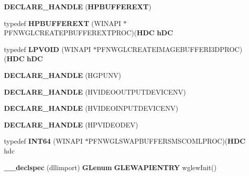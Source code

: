 \begin{DoxyCompactItemize}
\item 
{\bf D\+E\+C\+L\+A\+R\+E\+\_\+\+H\+A\+N\+D\+LE} ({\bf H\+P\+B\+U\+F\+F\+E\+R\+E\+XT})
\item 
typedef {\bf H\+P\+B\+U\+F\+F\+E\+R\+E\+XT} (W\+I\+N\+A\+PI $\ast$P\+F\+N\+W\+G\+L\+C\+R\+E\+A\+T\+E\+P\+B\+U\+F\+F\+E\+R\+E\+X\+T\+P\+R\+OC)({\bf H\+DC} {\bf h\+DC}
\item 
typedef {\bf L\+P\+V\+O\+ID} (W\+I\+N\+A\+PI $\ast$P\+F\+N\+W\+G\+L\+C\+R\+E\+A\+T\+E\+I\+M\+A\+G\+E\+B\+U\+F\+F\+E\+R\+I3\+D\+P\+R\+OC)({\bf H\+DC} {\bf h\+DC}
\item 
{\bf D\+E\+C\+L\+A\+R\+E\+\_\+\+H\+A\+N\+D\+LE} (H\+G\+P\+U\+NV)
\item 
{\bf D\+E\+C\+L\+A\+R\+E\+\_\+\+H\+A\+N\+D\+LE} (H\+V\+I\+D\+E\+O\+O\+U\+T\+P\+U\+T\+D\+E\+V\+I\+C\+E\+NV)
\item 
{\bf D\+E\+C\+L\+A\+R\+E\+\_\+\+H\+A\+N\+D\+LE} (H\+V\+I\+D\+E\+O\+I\+N\+P\+U\+T\+D\+E\+V\+I\+C\+E\+NV)
\item 
{\bf D\+E\+C\+L\+A\+R\+E\+\_\+\+H\+A\+N\+D\+LE} (H\+P\+V\+I\+D\+E\+O\+D\+EV)
\item 
typedef {\bf I\+N\+T64} (W\+I\+N\+A\+PI $\ast$P\+F\+N\+W\+G\+L\+S\+W\+A\+P\+B\+U\+F\+F\+E\+R\+S\+M\+S\+C\+O\+M\+L\+P\+R\+OC)({\bf H\+DC} hdc
\item 
{\bf \+\_\+\+\_\+declspec} (dllimport) {\bf G\+Lenum} {\bf G\+L\+E\+W\+A\+P\+I\+E\+N\+T\+RY} wglew\+Init()
\end{DoxyCompactItemize}
